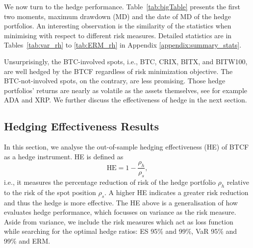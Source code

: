 We now turn to the hedge performance. 
Table~\ref{tab:bigTable}
presents the first two moments, maximum drawdown (MD) and the date of
MD of the hedge portfolios. An interesting observation is the similarity of
the statistics when minimising with respect to different risk measures.
Detailed statistics are in Tables~\ref{tab:var_rh} to \ref{tab:ERM_rh} in Appendix
\ref{appendix:summary_stats}. 
 
Unsurprisingly, the BTC-involved spots, i.e., BTC, CRIX, BITX, and
BITW100, are well hedged by the BTCF regardless of risk minimization
objective. 
The BTC-not-involved spots, on the contrary, are less promising. Those
hedge portfolios' returns are nearly as volatile as the
assets themselves, see for example ADA and XRP. 
We further discuss the effectiveness of hedge in the next
section. %

\subsection{Hedging Effectiveness Results}\label{sec: HE results}
In this section, we analyse the out-of-sample hedging effectiveness
(HE) of BTCF as a hedge instrument. 
HE is defined as $$\text{HE} = 1-\frac{\rho_h}{\rho_s},$$
i.e., it measures the percentage reduction of risk of the hedge
portfolio $\rho_h $ relative to the risk of the spot position $\rho_s$.
A higher HE indicates a greater risk reduction and thus the hedge is
more effective.  
The HE above is a generalisation of how \citet{ederington1979hedging}
evaluates hedge performance, which focusses on variance as the risk
measure. 
Aside from variance, we include the risk measures which act as
loss function while searching for the optimal hedge ratios: ES 95\%
and 99\%, VaR 95\% and 99\% and ERM.

